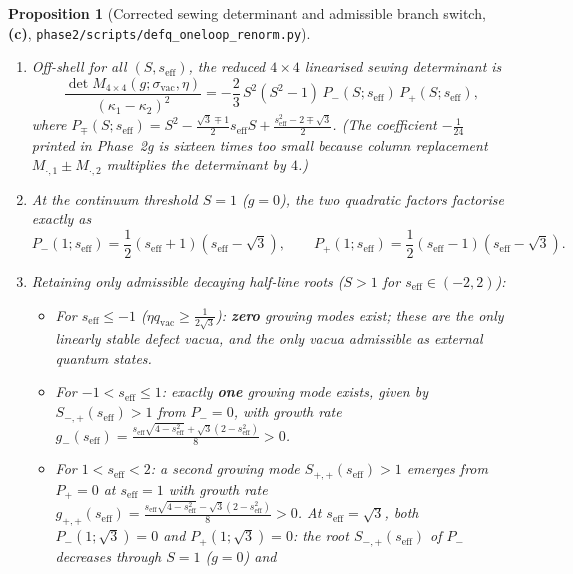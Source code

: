 \documentclass[11pt,a4paper]{article}
\newcommand{\Lc}{\textsf{\textbf{(c)}}}
\newcommand{\sren}{\texttt{phase2/\allowbreak scripts/\allowbreak defq\_\allowbreak oneloop\_\allowbreak renorm.py}}
\newtheorem{proposition}{Proposition}[section]
\theoremstyle{remark}
\begin{document}
\begin{proposition}[Corrected sewing determinant and admissible branch switch, \Lc, \sren]\label{prop:det_branches}
\begin{enumerate}
\item Off-shell for all $(S,s_{\mathrm{eff}})$, the reduced $4\times 4$
linearised sewing determinant is
\begin{equation}\label{eq:det_corrected}
  \frac{\det M_{4\times 4}(g;\sigma_{\mathrm{vac}},\eta)}{(\kappa_1-\kappa_2)^2}
  = -\frac{2}{3}\,S^2(S^2-1)\,P_-(S;s_{\mathrm{eff}})\,P_+(S;s_{\mathrm{eff}}),
\end{equation}
where $P_\mp(S;s_{\mathrm{eff}}) = S^2 - \frac{\sqrt{3}\mp 1}{2}s_{\mathrm{eff}}S + \frac{s_{\mathrm{eff}}^2-2\mp\sqrt{3}}{2}$.
(The coefficient $-\frac{1}{24}$ printed in Phase~2g is sixteen times too small
because column replacement $M_{\cdot,1}\pm M_{\cdot,2}$ multiplies the
determinant by $4$.)
\item At the continuum threshold $S = 1$ ($g = 0$), the two quadratic factors
factorise exactly as
\begin{equation}\label{eq:P_at_S1}
  P_-(1;s_{\mathrm{eff}}) = \frac{1}{2}(s_{\mathrm{eff}}+1)(s_{\mathrm{eff}}-\sqrt{3}), \qquad
  P_+(1;s_{\mathrm{eff}}) = \frac{1}{2}(s_{\mathrm{eff}}-1)(s_{\mathrm{eff}}-\sqrt{3}).
\end{equation}
\item Retaining only admissible decaying half-line roots ($S > 1$ for
$s_{\mathrm{eff}} \in (-2,2)$):
\begin{itemize}
\item For $s_{\mathrm{eff}} \le -1$ ($\eta q_{\mathrm{vac}} \ge \frac{1}{2\sqrt{3}}$):
\textbf{zero} growing modes exist; these are the only linearly stable defect
vacua, and the only vacua admissible as external quantum states.
\item For $-1 < s_{\mathrm{eff}} \le 1$: exactly \textbf{one} growing mode exists,
given by $S_{-,+}(s_{\mathrm{eff}}) > 1$ from $P_- = 0$, with growth rate
$g_-(s_{\mathrm{eff}}) = \frac{s_{\mathrm{eff}}\sqrt{4-s_{\mathrm{eff}}^2}+\sqrt{3}(2-s_{\mathrm{eff}}^2)}{8} > 0$.
\item For $1 < s_{\mathrm{eff}} < 2$: a second growing mode $S_{+,+}(s_{\mathrm{eff}}) > 1$
emerges from $P_+ = 0$ at $s_{\mathrm{eff}} = 1$ with growth rate
$g_{+,+}(s_{\mathrm{eff}}) = \frac{s_{\mathrm{eff}}\sqrt{4-s_{\mathrm{eff}}^2}-\sqrt{3}(2-s_{\mathrm{eff}}^2)}{8} > 0$.
At $s_{\mathrm{eff}} = \sqrt{3}$, both $P_-(1;\sqrt{3})=0$ and $P_+(1;\sqrt{3})=0$:
the root $S_{-,+}(s_{\mathrm{eff}})$ of $P_-$ decreases through $S=1$ ($g=0$) and

\end{itemize}
\end{enumerate}
\end{proposition}
\end{document}
